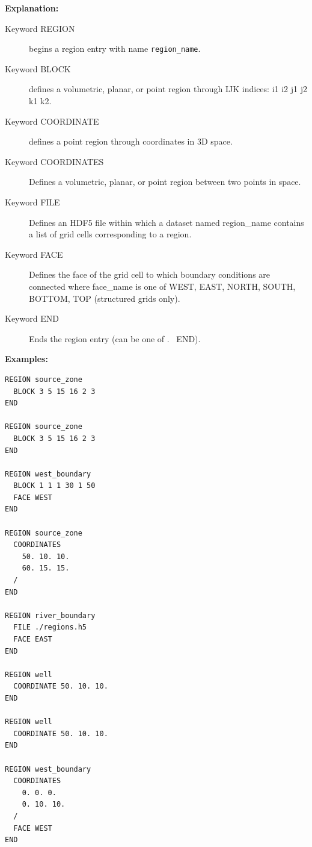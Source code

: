 {\noindent\bf Explanation:}
\begin{description}
\item[Keyword REGION] begins a region entry with name {\tt region\_name}.
\item[Keyword BLOCK] defines a volumetric, planar, or point region through IJK indices: i1 i2 j1 j2 k1 k2.
\item[Keyword COORDINATE] defines a point region through coordinates in 3D space.
\item[Keyword COORDINATES] Defines a volumetric, planar, or point region between two points in space.
\item[Keyword FILE] Defines an HDF5 file within which a dataset named
region\_name contains a list of grid cells corresponding to a region.
\item [Keyword FACE] Defines the face of the grid cell to which boundary conditions are connected where face\_name is one of WEST, EAST, NORTH, SOUTH, BOTTOM, TOP (structured grids only).
\item [Keyword END] Ends the region entry (can be one of . \ END).
\end{description}

\begin{mdframed}

{\noindent\bf
Examples:}
\footnotesize

\begin{verbatim}
REGION source_zone
  BLOCK 3 5 15 16 2 3
END

REGION source_zone
  BLOCK 3 5 15 16 2 3
END

REGION west_boundary
  BLOCK 1 1 1 30 1 50
  FACE WEST
END

REGION source_zone
  COORDINATES
    50. 10. 10.
    60. 15. 15.
  /
END

REGION river_boundary
  FILE ./regions.h5
  FACE EAST
END

REGION well
  COORDINATE 50. 10. 10.
END

REGION well
  COORDINATE 50. 10. 10.
END

REGION west_boundary
  COORDINATES
    0. 0. 0.
    0. 10. 10.
  /
  FACE WEST
END
\end{verbatim}
\normalsize
\end{mdframed}

\hyperlink{target_key}{\return}


\newpage
\protect\hypertarget{target_restart}{}

